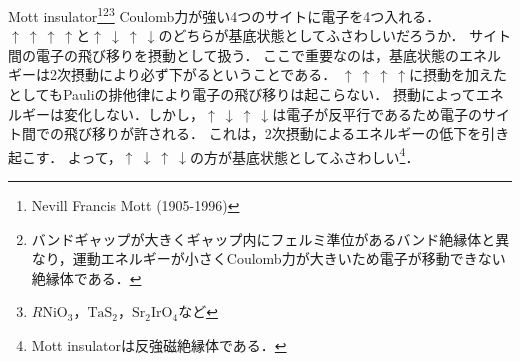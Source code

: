 \documentclass{report}
\begin{document}
  \begin{myex}{Mott insulator\footnote{
      Nevill Francis Mott (1905-1996)
    }\footnote{
      バンドギャップが大きくギャップ内にフェルミ準位があるバンド絶縁体と異なり，運動エネルギーが小さくCoulomb力が大きいため電子が移動できない絶縁体である．
    }\footnote{
      $R\mathrm{NiO_3，TaS_2，Sr_2IrO_4}$など
    }}{}
    Coulomb力が強い4つのサイトに電子を4つ入れる．
    $\uparrow \ \uparrow\ \uparrow\ \uparrow$と$\uparrow\ \downarrow\ \uparrow\ \downarrow$のどちらが基底状態としてふさわしいだろうか．
    サイト間の電子の飛び移りを摂動として扱う．
    ここで重要なのは，基底状態のエネルギーは2次摂動により必ず下がるということである．
    $\uparrow \ \uparrow\ \uparrow\ \uparrow$に摂動を加えたとしてもPauliの排他律により電子の飛び移りは起こらない．
    摂動によってエネルギーは変化しない．しかし，$\uparrow\ \downarrow\ \uparrow\ \downarrow$は電子が反平行であるため電子のサイト間での飛び移りが許される．
    これは，2次摂動によるエネルギーの低下を引き起こす．
    よって，$\uparrow\ \downarrow\ \uparrow\ \downarrow$の方が基底状態としてふさわしい\footnote{
      Mott insulatorは反強磁絶縁体である．
    }．
  \end{myex}
\end{document}
